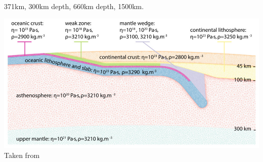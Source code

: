 371km, 300km depth, 660km depth, 1500km.

\begin{center}
\includegraphics[width=14cm]{python_codes/fieldstone_44/sifg19}\\
{\captionfont Taken from \cite{sifg19}}
\end{center}


